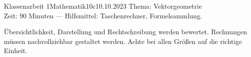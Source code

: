\documentclass[12pt,fleqn]{../exam2e}
\begin{document}
\thispagestyle{empty}%

\begin{klassenarbeitskopf}{Klassenarbeit 1}{Mathematik}{10c}{10.10.2023}
	Thema: Vektorgeometrie\\
	Zeit: 90 Minuten --- Hilfsmittel: Taschenrechner, Formelsammlung.
\end{klassenarbeitskopf}

\vspace*{1.5ex}
Übersichtlichkeit, Darstellung und Rechtschreibung werden bewertet.
Rechnungen müssen nachvollziehbar gestaltet werden. 
Achte bei allen Größen auf die richtige Einheit.
\end{document}
